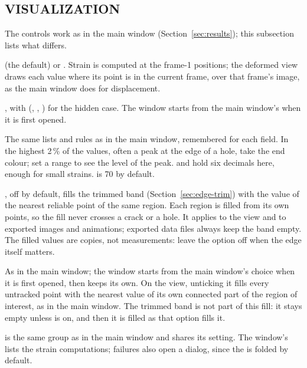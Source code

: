 \subsection{VISUALIZATION}
\label{sec:strain-viz}

The controls work as in the main window (Section~\ref{sec:results}); this subsection lists what
differs.

\begin{description}[leftmargin=1.2cm,style=nextline]
  \item[Show on]
     (the default) or . Strain is computed at the frame-1
    positions; the deformed view draws each value where its point is in the current frame, over
    that frame's image, as the main window does for displacement.
  \item[Background]
    , with  (, ,
    ) for the hidden case. The window starts from the main window's
     when it is first opened.
  \item[Colormap, Range, Opacity]
    The same lists and rules as in the main window, remembered for each field. In  the
    highest 2\,\% of the values, often a peak at the edge of a hole, take the end colour; set a
     range to see the level of the peak.  and  hold six decimals here,
    enough for small strains.  is 70 by default.
  \item[Edges]
    , off by default, fills the trimmed band
    (Section~\ref{sec:edge-trim}) with the value of the nearest reliable point of the same
    region. Each region is filled from its own points, so the fill never crosses a crack or a
    hole. It applies to the view and to exported images and animations; exported data files
    always keep the band empty. The filled values are copies, not measurements: leave the option
    off when the edge itself matters.
  \item[Hide untracked regions]
    As in the main window; the window starts from the main window's choice when it is first
    opened, then keeps its own. On the  view, unticking it fills every
    untracked point with the nearest value of its own connected part of the region of interest,
    as in the main window. The trimmed band is not part of this fill: it stays empty unless
     is on, and then it is filled as that option fills it.
\end{description}

 is the same group as in the main window and shares its setting. The window's
 lists the strain computations; failures also open a dialog, since the  is folded
by default.
